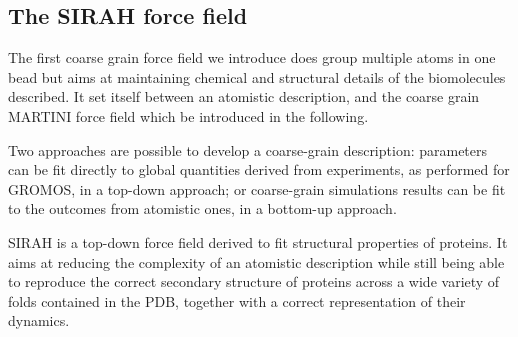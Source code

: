 \subsection{The SIRAH force field}

The first coarse grain force field we introduce does group multiple atoms in one bead but aims at maintaining chemical and structural details of the biomolecules described. It set itself between an atomistic description, and the coarse grain MARTINI force field which be introduced in the following.

Two approaches are possible to develop a coarse-grain description: parameters can be fit directly to global quantities derived from experiments, as performed for GROMOS, in a top-down approach; or coarse-grain simulations results can be fit to the outcomes from atomistic ones, in a bottom-up approach.

SIRAH \cite{Machado2018,Barrera2019} is a top-down force field derived to fit structural properties of proteins. It aims at reducing the complexity of an atomistic description while still being able to reproduce the correct secondary structure of proteins across a wide variety of folds contained in the PDB, together with a correct representation of their dynamics.

